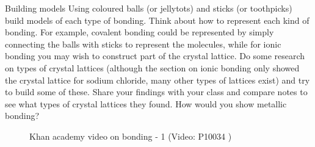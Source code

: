         \label{m38694*id754}
            \begin{activity}{Building models}
            \nopagebreak
        \label{m38694*id87434}Using coloured balls (or jellytots) and sticks (or toothpicks) build models of each type of bonding. Think about how to represent each kind of bonding. For example, covalent bonding could be represented by simply connecting the balls with sticks to represent the molecules, while for ionic bonding you may wish to construct part of the crystal lattice. Do some research on types of crystal lattices (although the section on ionic bonding only showed the crystal lattice for sodium chloride, many other types of lattices exist) and try to build some of these. Share your findings with your class and compare notes to see what types of crystal lattices they found. How would you show metallic bonding?\par 
\end{activity}
\label{m38694*eip-515}
    \setcounter{subfigure}{0}
	\begin{figure}[H] %
    \textnormal{Khan academy video on bonding - 1}\vspace{.1in} \nopagebreak
  \label{m38694*yt-media1}\label{m38694*yt-video1}
             { (Video:  P10034 )}
      \vspace{2pt}
    \vspace{.1in}
 \end{figure}       \par \label{m38694*secfhsst!!!underscore!!!id617}
